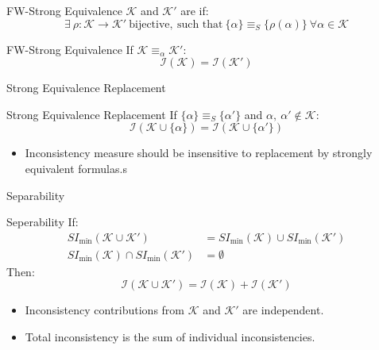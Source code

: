 \begin{frame}{FW-Strong Equivalence}
    \(\mathcal{K}\) and \(\mathcal{K}'\) are  if:
    \[
        \exists\ \rho : \mathcal{K} \rightarrow \mathcal{K}'\ \text{bijective},\ \text{such that}\ \{\alpha\} \equiv_S \{\rho(\alpha)\}\ \forall \alpha \in \mathcal{K}
    \]
    \begin{block}{FW-Strong Equivalence}
        If \(\mathcal{K} \equiv_{\alpha} \mathcal{K}'\):
        \[
            \mathcal{I}(\mathcal{K}) = \mathcal{I}(\mathcal{K}')
        \]
    \end{block}
\end{frame}

\begin{frame}{Strong Equivalence Replacement}
    \begin{block}{Strong Equivalence Replacement}
        If \(\{\alpha\} \equiv_S \{\alpha'\}\) and \(\alpha,\ \alpha' \notin \mathcal{K}\):
        \[
            \mathcal{I}(\mathcal{K} \cup \{\alpha\}) = \mathcal{I}(\mathcal{K} \cup \{\alpha'\})
        \]
    \end{block}
    \begin{itemize}
        \item Inconsistency measure should be insensitive to replacement by strongly equivalent formulas.s
    \end{itemize}
\end{frame}

\begin{frame}{Separability}
    \begin{block}{Seperability}
        If:
        \begin{align*}
            SI_{\min}(\mathcal{K} \cup \mathcal{K}')            & = SI_{\min}(\mathcal{K}) \cup SI_{\min}(\mathcal{K}') \\
            SI_{\min}(\mathcal{K}) \cap SI_{\min}(\mathcal{K}') & = \emptyset
        \end{align*}
        Then:
        \[
            \mathcal{I}(\mathcal{K} \cup \mathcal{K}') = \mathcal{I}(\mathcal{K}) + \mathcal{I}(\mathcal{K}')
        \]
    \end{block}
    \begin{itemize}
        \item Inconsistency contributions from \(\mathcal{K}\) and \(\mathcal{K}'\) are independent.
        \item Total inconsistency is the sum of individual inconsistencies.
    \end{itemize}
\end{frame}

